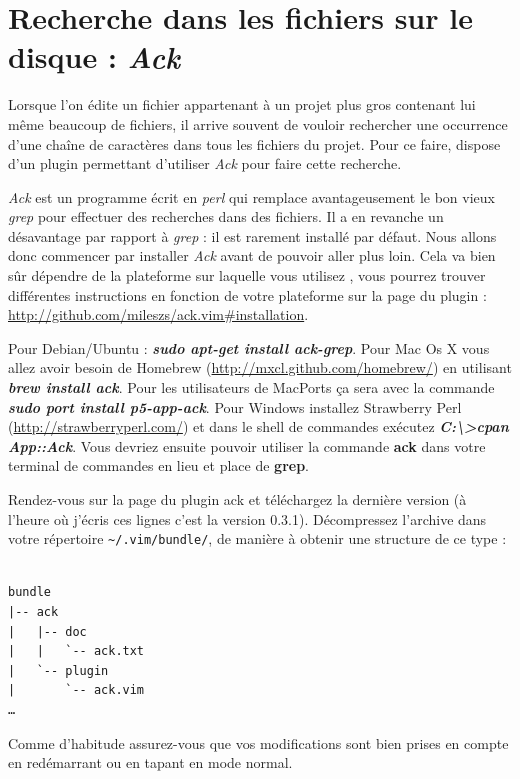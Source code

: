 \section{Recherche dans les fichiers sur le disque : \emph{Ack}}

Lorsque l'on édite un fichier appartenant à un projet plus gros contenant lui même beaucoup de fichiers, il arrive souvent de vouloir rechercher une occurrence d'une chaîne de caractères dans tous les fichiers du projet. Pour ce faire, \vim dispose d'un plugin permettant d'utiliser \emph{Ack} pour faire cette recherche.

\emph{Ack} est un programme écrit en \emph{perl} qui remplace avantageusement le bon vieux \emph{grep} pour effectuer des recherches dans des fichiers. Il a en revanche un désavantage par rapport à \emph{grep} : il est rarement installé par défaut. Nous allons donc commencer par installer \emph{Ack} avant de pouvoir aller plus loin. Cela va bien sûr dépendre de la plateforme sur laquelle vous utilisez \vim, vous pourrez trouver différentes instructions en fonction de votre plateforme sur la page du plugin : \url{http://github.com/mileszs/ack.vim#installation}.

Pour Debian/Ubuntu : \textbf{\emph{sudo apt-get install ack-grep}}. Pour Mac Os X vous allez avoir besoin de Homebrew (\url{http://mxcl.github.com/homebrew/}) en utilisant \textbf{\emph{brew install ack}}. Pour les utilisateurs de MacPorts ça sera avec la commande \textbf{\emph{sudo port install p5-app-ack}}. Pour Windows installez Strawberry Perl (\url{http://strawberryperl.com/}) et dans le shell de commandes exécutez \textbf{\emph{C:\textbackslash>cpan App::Ack}}. Vous devriez ensuite pouvoir utiliser la commande \textbf{ack} dans votre terminal de commandes en lieu et place de \textbf{grep}.

Rendez-vous sur la page du plugin ack et téléchargez la dernière version (à l'heure où j'écris ces lignes c'est la version 0.3.1). Décompressez l'archive dans votre répertoire \Verb|~/.vim/bundle/|, de manière à obtenir une structure de ce type :

\begin{verbatim}

bundle
|-- ack
|   |-- doc
|   |   `-- ack.txt
|   `-- plugin
|       `-- ack.vim
…
\end{verbatim}

Comme d'habitude assurez-vous que vos modifications sont bien prises en compte en redémarrant \vim ou en tapant  en mode normal.

